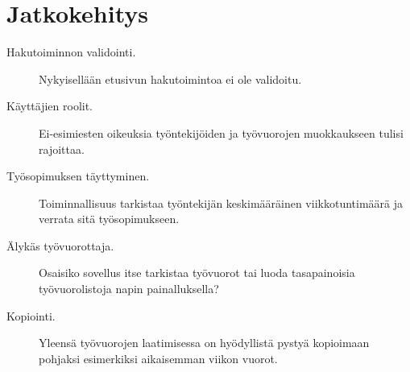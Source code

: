 \documentclass[10pt,titlepage,hidelinks]{scrartcl}
\begin{document}
\section{Jatkokehitys}

\begin{description}
\item[Hakutoiminnon validointi.] Nykyisellään etusivun hakutoimintoa ei ole validoitu.
\item[Käyttäjien roolit.] Ei-esimiesten oikeuksia työntekijöiden ja työvuorojen muokkaukseen tulisi rajoittaa.
\item[Työsopimuksen täyttyminen.] Toiminnallisuus tarkistaa työntekijän keskimääräinen viikkotuntimäärä ja verrata sitä työsopimukseen.
\item[Älykäs työvuorottaja.] Osaisiko sovellus itse tarkistaa työvuorot tai luoda tasapainoisia työvuorolistoja napin painalluksella?
\item[Kopiointi.] Yleensä työvuorojen laatimisessa on hyödyllistä pystyä kopioimaan pohjaksi esimerkiksi aikaisemman viikon vuorot.
\end{description}
\end{document}
